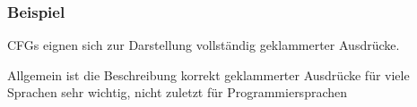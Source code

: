 \documentclass[aspectratio=1610,onlymath]{beamer}
\begin{document}
\begin{frame}\frametitle{Beispiel}

CFGs eignen sich zur Darstellung vollständig geklammerter Ausdrücke.
\bigskip

\bigskip

Allgemein ist die Beschreibung korrekt geklammerter Ausdrücke für viele Sprachen sehr wichtig, nicht zuletzt für Programmiersprachen

\end{frame}
\end{document}
